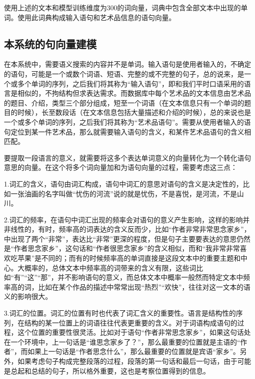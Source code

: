 使用上述的文本和模型训练维度为300的词向量，词典中包含全部文本中出现的单词。使用此词典构成输入语句和艺术品信息的语句向量。


\subsection{本系统的句向量建模}

在本系统中，需要语义搜索的内容并不是单词。输入语句是使用者输入的，不确定的语句，可能是一个或数个词语、短语、完整的或不完整的句子，总的说来，是一个或多个单词的序列，之后我们将其称为“输入语句”，即和我们平时口语采用的语言是相似的，不拘结构但求表达需求。而数据库中每个艺术品的文本信息由艺术品的题目、介绍，类型三个部分组成，短至一个词语（在文本信息只有一个单词的题目的时候），长至数段话（在文本信息包括大量描述和介绍的时候），总的来说也是一个或多个单词的序列，之后我们将其称为“艺术品语句”。需要从使用者输入的语句定位到某一件艺术品，那么就需要输入语句的含义，和某件艺术品语句的含义相匹配。

要提取一段语言的意义，就需要将这多个表达单词意义的向量转化为一个转化语句意思的向量。在这个将多个词向量加和为语句向量的过程，需要考虑这三点：

1.词汇的含义，语句由词汇构成，语句中词汇的意思对语句的含义是决定性的，比如一张油画的名字叫做“忧伤的河流”说的就是忧伤，不是喜悦，是河流，不是山川。

2.词汇的频率，在语句中词汇出现的频率会对语句的意义产生影响，这样的影响并非线性的，有时，频率高的词表达的含义反而少，比如“作者非常非常思念家乡”，中出现了两个“非常”，表达比“非常”更深的程度，但是句子主要要表达的意思仍然是“作者思念家乡”，这句话和“作者很思念家乡”的含义相似，而和“我非常非常喜欢吃苹果”是不同的；而有的时候频率高的单词直接是这段文本中的重要主题和中心。大概率的，总体文本中频率高的词带来的含义有限，这些词比如“有”“这”“那”，并不影响语句的意义，而总体文本中概率一般然而特定文本中频率高的词，比如在某个作品的描述中常常出现“热烈”“欢快”，往往对这一文本的语义的影响很大。

3.词汇的位置。词汇的位置有时也代表了词汇含义的重要性。语言是结构性的序列，在结构的某一位置上的词语往往代表更重要的含义。对于词语构成语句的过程，这个位置的重要性很灵活。比如对于语句“作者非常思念家乡”，如果这句话处在一个环境中，上一句话是“谁思念家乡了？”，那么最重要的位置就是主语的“作者”，而如果上一句话是“作者思念什么”，那么最重要的位置就是宾语“家乡”。另外，如果考虑句子构成完整段落的过程，段落的第一句话和最后一句话，由于可能是总起和总结的句子，所以格外重要，这也是考察位置得到的信息。

